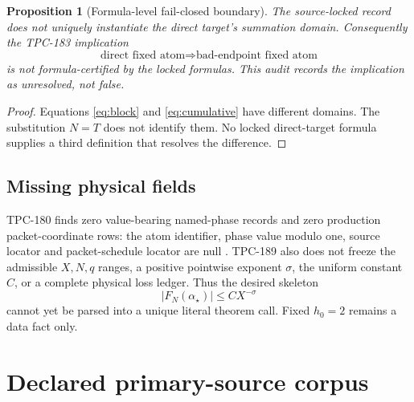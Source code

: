 \documentclass[11pt]{article}
\newtheorem{proposition}[theorem]{Proposition}
\begin{document}
\begin{proposition}[Formula-level fail-closed boundary]
\label{prop:formula}
The source-locked record does not uniquely instantiate the direct target's
summation domain.  Consequently the TPC-183 implication
\[
 \text{direct fixed atom}\Longrightarrow\text{bad-endpoint fixed atom}
\]
is not formula-certified by the locked formulas.  This audit records the
implication as unresolved, not false.
\end{proposition}

\begin{proof}
Equations \eqref{eq:block} and \eqref{eq:cumulative} have different
domains.  The substitution \(N=T\) does not identify them.  No locked
direct-target formula supplies a third definition that resolves the
difference.
\end{proof}

\subsection{Missing physical fields}

TPC-180 finds zero value-bearing named-phase records and zero production
packet-coordinate rows: the atom identifier, phase value modulo one,
source locator and packet-schedule locator are null \citep{WangTPC180}.
TPC-189 also does not freeze the admissible \(X,N,q\) ranges, a positive
pointwise exponent \(\sigma\), the uniform constant \(C\), or a complete
physical loss ledger.  Thus the desired skeleton
\[
 |F_N(\alpha_\star)|\le C X^{-\sigma}
\]
cannot yet be parsed into a unique literal theorem call.  Fixed \(h_0=2\)
remains a data fact only.

\section{Declared primary-source corpus}
\end{document}
